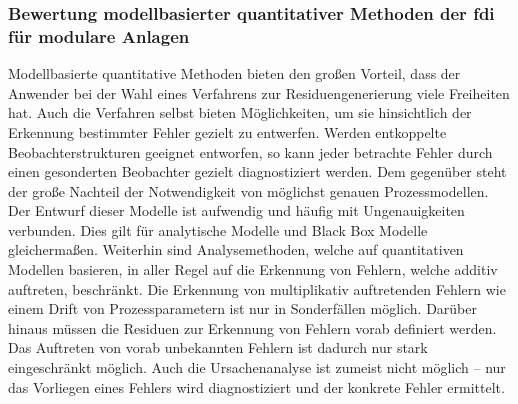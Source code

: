 \subsubsection{Bewertung modellbasierter quantitativer Methoden der \ac{fdi} f\"ur modulare Anlagen}
Modellbasierte quantitative Methoden bieten den gro\ss{}en Vorteil, dass der Anwender bei der Wahl eines Verfahrens zur Residuengenerierung viele Freiheiten hat. Auch die Verfahren selbst bieten M\"oglichkeiten, um sie hinsichtlich der Erkennung bestimmter Fehler gezielt zu entwerfen. Werden entkoppelte Beobachterstrukturen geeignet entworfen, so kann jeder betrachte Fehler durch einen gesonderten Beobachter gezielt diagnostiziert werden. Dem gegen\"uber steht der gro\ss{}e Nachteil der Notwendigkeit von m\"oglichst genauen Prozessmodellen. Der Entwurf dieser Modelle ist aufwendig und h\"aufig mit Ungenauigkeiten verbunden. Dies gilt f\"ur analytische Modelle und Black Box Modelle gleicherma\ss{}en. Weiterhin sind Analysemethoden, welche auf quantitativen Modellen basieren, in aller Regel auf die Erkennung von Fehlern, welche additiv auftreten, beschr\"ankt. Die Erkennung von multiplikativ auftretenden Fehlern wie einem Drift von Prozessparametern ist nur in Sonderf\"allen m\"oglich. Dar\"uber hinaus m\"ussen die Residuen zur Erkennung von Fehlern vorab definiert werden. Das Auftreten von vorab  unbekannten Fehlern ist dadurch nur stark eingeschr\"ankt m\"oglich. Auch die Ursachenanalyse ist zumeist nicht m\"oglich -- nur das Vorliegen eines Fehlers wird diagnostiziert und der konkrete Fehler ermittelt.  {\cite[S. 17 f.]{Venkatasubramanian_2003}}

